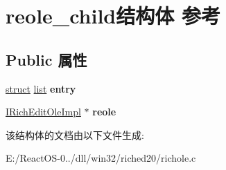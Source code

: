 \hypertarget{structreole__child}{}\section{reole\+\_\+child结构体 参考}
\label{structreole__child}
\subsection*{Public 属性}
\begin{DoxyCompactItemize}
\item 
\mbox{\label{structreole__child_ae2f685e617d47287254761d852b40ef2}} 
\hyperlink{interfacestruct}{struct} \hyperlink{classlist}{list} {\bfseries entry}
\item 
\mbox{\label{structreole__child_a46e10f7a9840fc257e55d2aa2526e296}} 
\hyperlink{struct_i_rich_edit_ole_impl}{I\+Rich\+Edit\+Ole\+Impl} $\ast$ {\bfseries reole}
\end{DoxyCompactItemize}


该结构体的文档由以下文件生成\+:\begin{DoxyCompactItemize}
\item 
E\+:/\+React\+O\+S-\/0../dll/win32/riched20/richole.\+c\end{DoxyCompactItemize}
